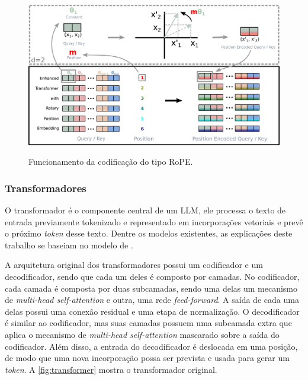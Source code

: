 \begin{figure}[ht]
      \centering
      \caption{\small Funcionamento da codificação do tipo \ac{RoPE}.}
      \includegraphics[width=0.8\columnwidth,keepaspectratio]{images/rotary_positional_embeddings.jpg}
      \label{fig:rotary_positional_embeddings}
\end{figure}

\subsubsection{Transformadores} \label{sec:transformers}

O transformador é o componente central de um \ac{LLM}, ele processa o texto de entrada previamente tokenizado e representado em incorporações vetoriais e prevê o
próximo \textit{token} desse texto. Dentre os modelos existentes, as explicações deste trabalho se baseiam no modelo de \textcite{transformer}.

A arquitetura original dos transformadores possui um codificador e um decodificador, sendo que cada um deles é composto por camadas. No codificador, cada camada é
composta por duas subcamadas, sendo uma delas um mecanismo de \textit{multi-head self-attention} e outra, uma rede \textit{feed-forward}. A saída de cada uma delas possui
uma conexão residual e uma etapa de normalização. O decodificador é similar ao codificador, mas suas camadas possuem uma subcamada extra que aplica o mecanismo de
\textit{multi-head self-attention} mascarado sobre a saída do codificador. Além disso, a entrada do decodificador é deslocada em uma posição, de modo que uma nova
incorporação possa ser prevista e usada para gerar um \textit{token}. A \autoref{fig:transformer} mostra o transformador original.


